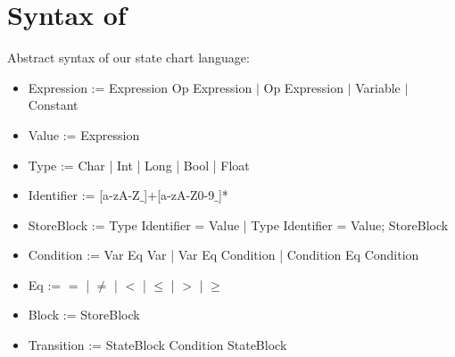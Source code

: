 \section{Syntax of \plcchart}

Abstract syntax of our state chart language:

\begin{itemize}
	\item Expression := Expression Op Expression $|$ Op Expression $|$ Variable $|$ Constant
	\item Value := Expression
	\item Type := Char | Int | Long | Bool | Float
	\item Identifier := [a-zA-Z$\_$]+[a-zA-Z0-9$\_$]*  
	
	\item StoreBlock := Type Identifier = Value | Type Identifier = Value; StoreBlock

	\item Condition := Var Eq Var | Var Eq Condition | Condition Eq Condition
	
	\item Eq := $=$ | $\neq$ | $<$ | $\leq$ | $>$ | $\geq$	

	\item Block := StoreBlock	
	
	\item Transition := StateBlock Condition StateBlock
\end{itemize}

